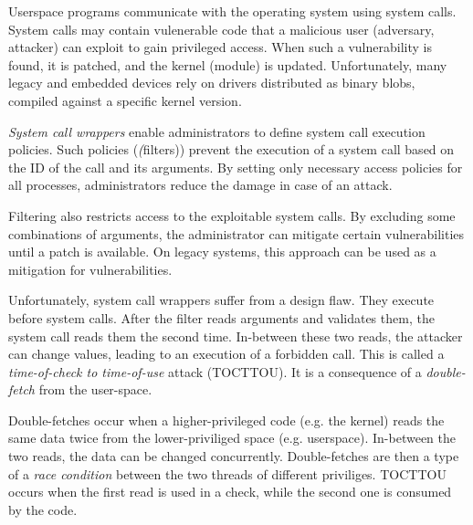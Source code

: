 Userspace programs communicate with the operating system using system calls.
System calls may contain vulenerable code that a malicious user (adversary,
attacker) can exploit to gain privileged access. When such a vulnerability
is found, it is patched, and the kernel (module) is updated. Unfortunately,
many legacy and embedded devices rely on drivers distributed as binary blobs,
compiled against a specific kernel version.

\emph{System call wrappers} enable administrators to define system call
execution policies. Such policies (\emph(filters)) prevent the execution of a
system call based on the ID of the call and its arguments. By setting only
necessary access policies for all processes, administrators reduce the damage in
case of an attack. 

Filtering also restricts access to the exploitable system
calls. By excluding some combinations of arguments, the administrator can 
mitigate certain vulnerabilities until a patch is available. On legacy systems,
this approach can be used as a mitigation for vulnerabilities.



Unfortunately, system call wrappers suffer from a design flaw. They execute before system calls. After
the filter reads arguments and validates them, the system call reads them the
second time. In-between these two reads, the attacker can change values,
leading to an execution of a forbidden call. This is called a
\emph{time-of-check to time-of-use} attack (TOCTTOU). It is a consequence of a
\emph{double-fetch} from the user-space.

Double-fetches occur when a higher-privileged code (e.g. the kernel) reads
the same data twice from the lower-priviliged space (e.g. userspace). In-between
the two reads, the data can be changed concurrently. Double-fetches are then
a type of a \emph{race condition} between the two threads of different priviliges.
TOCTTOU occurs when the first read is used in a check, while the second one is
consumed by the code. 

